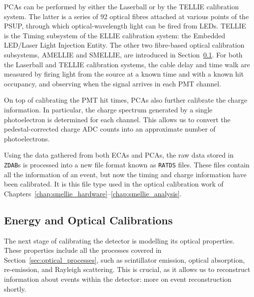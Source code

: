 PCAs can be performed by either the Laserball or by the TELLIE calibration system. The latter is a series of 92 optical fibres attached at various points of the PSUP, through which optical-wavelength light can be fired from LEDs. TELLIE is the Timing subsystem of the ELLIE calibration system: the Embedded LED/Laser Light Injection Entity. The other two fibre-based optical calibration subsystems, AMELLIE and SMELLIE, are introduced in Section~\ref{sec:eo_calibs}. For both the Laserball and TELLIE calibration systems, the cable delay and time walk are measured by firing light from the source at a known time and with a known hit occupancy, and observing when the signal arrives in each PMT channel.

On top of calibrating the PMT hit times, PCAs also further calibrate the charge information. In particular, the charge spectrum generated by a single photoelectron is determined for each channel. This allows us to convert the pedestal-corrected charge ADC counts into an approximate number of photoelectrons.

Using the data gathered from both ECAs and PCAs, the raw data stored in \texttt{ZDAB}s is processed into a new file format known as \texttt{RATDS} files. These files contain all the information of an event, but now the timing and charge information have been calibrated. It is this file type used in the optical calibration work of Chapters~\ref{chap:smellie_hardware}--\ref{chap:smellie_analysis}.

\subsection{Energy and Optical Calibrations}\label{sec:eo_calibs}
The next stage of calibrating the detector is modelling its optical properties. These properties include all the processes covered in Section~\ref{sec:optical_processes}, such as scintillator emission, optical absorption, re-emission, and Rayleigh scattering.
This is crucial, as it allows us to reconstruct information about events within the detector: more on event reconstruction shortly.


